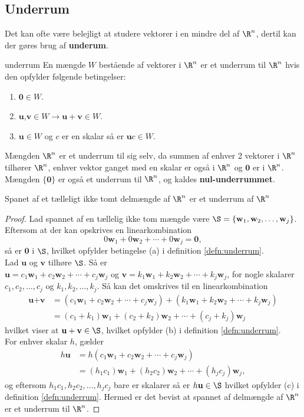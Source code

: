 \subsection{Underrum}
Det kan ofte være belejligt at studere vektorer i en mindre del af $\R^n$, dertil kan der gøres brug af \textbf{underum}.
\begin{defn}{}{underrum}
En mængde $W$ bestående af vektorer i $\R^n$ er et underrum til $\R^n$ hvis den opfylder følgende betingelser:	
\begin{enumerate}[label=(\alph*)]
	\item  $\textbf{0}\in W$.
	\item $\textbf{u}$,$\textbf{v} \in W \rightarrow \textbf{u}+\textbf{v} \in W $.
	\item $\textbf{u} \in W$ og $c$ er en skalar så er $\textbf{u}c \in W$.
\end{enumerate}
\end{defn}
\noindent
Mængden $\R^n$ er et underrum til sig selv, da summen af enhver 2 vektorer i $\R^n$ tilhører $\R^n$, enhver vektor ganget med en skalar er også i $\R^n$ og $\textbf{0}$ er i $\R^n$. Mængden $\{\textbf{0}\}$ er også et underrum til $\R^n$, og kaldes \textbf{nul-underrummet}.


\begin{thm}{}{}
Spanet af et tælleligt ikke tomt delmængde af $\R^n$ er et underrum af $\R^n$
\end{thm}
\begin{proof}
Lad spannet af en tællelig ikke tom mængde være 
$\S=\{\textbf{w}_1 , \textbf{w}_2 , \ldots , \textbf{w}_j\}$.
Eftersom at der kan opskrives en linearkombination $$0\textbf{w}_1 + 0\textbf{w}_2 + \cdots + 0\textbf{w}_j=\textbf{0},$$ så er $\textbf{0}$ i  $\S$, hvilket opfylder betingelse (a) i definition \ref{defn:underrum}.\\
Lad $\textbf{u}$ og $\textbf{v}$ tilhøre $\S$. Så er\\
$\textbf{u}=c_1\textbf{w}_1+c_2\textbf{w}_2+\cdots+c_j\textbf{w}_j$ og $\textbf{v}=k_1\textbf{w}_1+k_2\textbf{w}_2+\cdots+k_j\textbf{w}_j$, for nogle skalarer $c_1,c_2,\ldots,c_j$ og $k_1,k_2,\ldots,k_j$. Så kan det omskrives til en linearkombination
\begin{align*}
\textbf{u}+\textbf{v}&=(c_1\textbf{w}_1+c_2\textbf{w}_2+\cdots+c_j\textbf{w}_j)+(k_1\textbf{w}_1+k_2\textbf{w}_2+\cdots+k_j\textbf{w}_j)\\
&=(c_1+k_1)\textbf{w}_1+(c_2+k_2)\textbf{w}_2+\cdots+(c_j+k_j)\textbf{w}_j
\end{align*}
hvilket viser at $\textbf{u}+\textbf{v}\in \S$, hvilket opfylder (b) i definition \ref{defn:underrum}.\\
For enhver skalar $h$, gælder
\begin{align*}
h\textbf{u}&=h(c_1\textbf{w}_1+c_2\textbf{w}_2+\cdots+c_j\textbf{w}_j)\\
&=(h_1c_1)\textbf{w}_1+(h_2c_2)\textbf{w}_2+\cdots+(h_jc_j)\textbf{w}_j,
\end{align*}
og eftersom $h_1c_1,h_2c_2,\ldots,h_jc_j$ bare er skalarer så er $h\textbf{u}\in \S$ hvilket opfylder (c) i definition \ref{defn:underrum}.
Hermed er det bevist at spannet af delmængde af $\R^n$ er et underrum til $\R^n$.
\end{proof}

